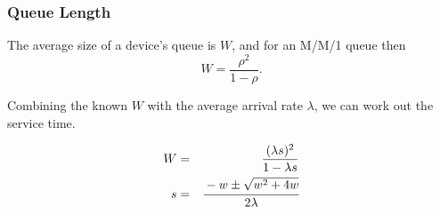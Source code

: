 \begin{frame}
\frametitle{Queue Length}

\begin{changemargin}{0.8cm}
\large 

The average size of a device's queue is $W$, and for an M/M/1 queue then 
\[ W = \dfrac{\rho^{2}}{1-\rho}.\]

Combining the known $W$ with the average arrival rate $\lambda$, we can work out the service time. 

\begin{eqnarray*}
W &=& \dfrac{(\lambda s)^{2}}{1 - \lambda s}\\
s &=& \cfrac{-w \pm \sqrt{w^{2}+4w}}{2\lambda}\\
\end{eqnarray*}
\end{changemargin}



\end{frame}



